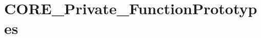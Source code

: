 \hypertarget{group___c_o_r_e___private___function_prototypes}{}\section{C\+O\+R\+E\+\_\+\+Private\+\_\+\+Function\+Prototypes}
\label{group___c_o_r_e___private___function_prototypes}
